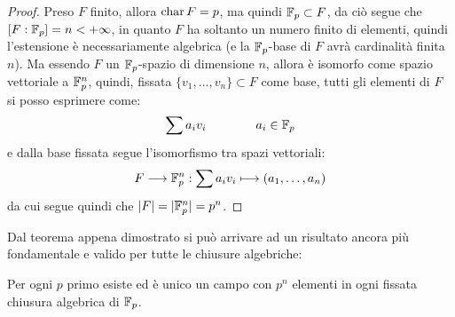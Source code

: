 \documentclass[11pt]{scrartcl}
\begin{document}
\begin{proof}
	Preso $F$ finito, allora $\text{char}\, F = p$, ma quindi ${\mathbb F}_p \subset F$, da ciò segue che
	$[F : {\mathbb F}_p] = n < +\infty$, in quanto $F$ ha soltanto un numero finito di elementi, quindi
	l'estensione è necessariamente algebrica (e la ${\mathbb F}_p$-base di $F$ avrà cardinalità finita $n$).
	Ma essendo $F$ un ${\mathbb F}_p$-spazio di dimensione $n$, allora è isomorfo come spazio vettoriale a ${\mathbb F}_p^n$, quindi, fissata
	$\{v_1, \ldots, v_n\} \subset F$ come base, tutti gli elementi di $F$ si posso esprimere come:
		\[ \sum a_iv_i
		\qquad\qquad a_i \in {\mathbb F}_p
			\]
	e dalla base fissata segue l'isomorfismo tra spazi vettoriali:
		\[ F \longrightarrow {\mathbb F}_p^n : \sum a_iv_i \longmapsto (a_1,\ldots,a_n)
			\]
	da cui segue quindi che $|F| = |{\mathbb F}_p^n| = p^n$.
\end{proof}

Dal teorema appena dimostrato si può arrivare ad un risultato ancora più fondamentale e valido per tutte le chiusure algebriche:

\begin{theorem}
	\label{cf:5.9}
	Per ogni $p$ primo esiste ed è unico un campo con $p^n$ elementi
	in ogni fissata chiusura algebrica di ${\mathbb F}_p$.
\end{theorem}
\end{document}
